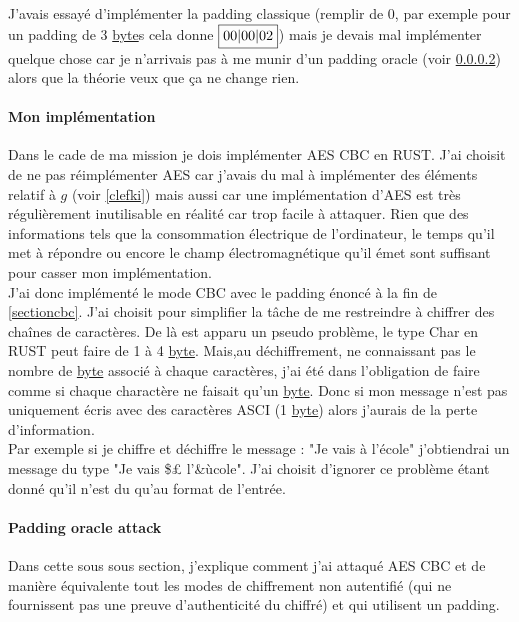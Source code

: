 \documentclass[a4paper, 12pt]{article}
\begin{document}
J'avais essayé d'implémenter la padding classique (remplir de $0$, par exemple pour un padding de 3 \hyperref[byte]{byte}s cela donne $\fbox{00|00|02}$) mais je devais mal implémenter quelque chose car je n'arrivais pas à me munir d'un padding oracle (voir \ref{padoracle}) alors que la théorie veux que ça ne change rien.

\paragraph{Mon implémentation}
Dans le cade de ma mission je dois implémenter AES CBC en RUST. 
J'ai choisit de ne pas réimplémenter AES car j'avais du mal à implémenter des éléments relatif à $g$ (voir \ref{clefki}) mais aussi car une implémentation d'AES est très régulièrement inutilisable en réalité car trop facile à attaquer. Rien que des informations tels que la consommation électrique de l'ordinateur, le temps qu'il met à répondre ou encore le champ électromagnétique qu'il émet sont suffisant pour casser mon implémentation.  \\

J'ai donc implémenté le mode CBC avec le padding énoncé à la fin de \ref{sectioncbc}. J'ai choisit pour simplifier la tâche de me restreindre à chiffrer des chaînes de caractères. De là est apparu un pseudo problème, le type Char en RUST peut faire de 1 à 4 \hyperref[byte]{byte}. Mais,au déchiffrement, ne connaissant pas le nombre de \hyperref[byte]{byte} associé à chaque caractères, j'ai été dans l'obligation de faire comme si chaque charactère ne faisait qu'un \hyperref[byte]{byte}. Donc si mon message n'est pas uniquement écris avec des caractères ASCI (1 \hyperref[byte]{byte}) alors j'aurais de la perte d'information. \\
Par exemple si je chiffre et déchiffre le message : "Je vais à l'école" j'obtiendrai un message du type "Je vais \$£ l'\&ùcole". 
J'ai choisit d'ignorer ce problème étant donné qu'il n'est du qu'au format de l'entrée.

\paragraph{Padding oracle attack}\label{padoracle}
Dans cette sous sous section, j'explique comment j'ai attaqué AES CBC et de manière équivalente tout les modes de chiffrement non autentifié (qui ne fournissent pas une preuve d'authenticité du chiffré) et qui utilisent un padding. \\ 
\end{document}
